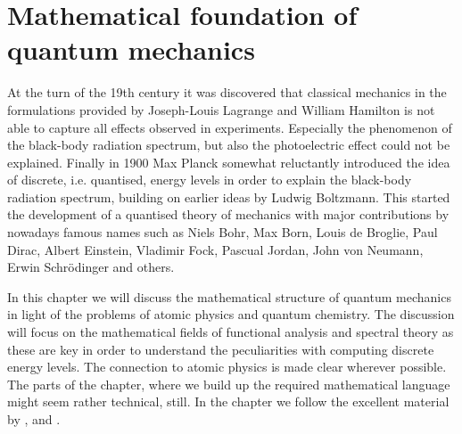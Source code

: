 \chapter{Mathematical foundation of quantum mechanics}
\label{ch:QM}


\noindent
At the turn of the 19th century it was discovered
that classical mechanics in the formulations provided
by Joseph-Louis Lagrange and William Hamilton
is not able to capture all effects observed in experiments.
Especially the phenomenon of the black-body radiation spectrum,
but also the photoelectric effect could not be explained.
Finally in 1900 Max Planck somewhat reluctantly introduced the idea of discrete,
i.e. quantised, energy levels
in order to explain the black-body radiation spectrum,
building on earlier ideas by Ludwig Boltzmann.
This started the development of a quantised theory of mechanics
with major contributions by nowadays famous names such as
Niels Bohr, Max Born, Louis de Broglie, Paul Dirac, Albert Einstein,
Vladimir Fock, Pascual Jordan, John von Neumann, Erwin Schrödinger
and others.

In this chapter we will discuss the mathematical structure
of quantum mechanics in light of the problems of atomic physics
and quantum chemistry.
The discussion will focus on the mathematical fields of functional
analysis and spectral theory as these are key in order
to understand the peculiarities with computing discrete energy levels.
The connection to atomic physics is made clear wherever possible.
The parts of the chapter, where we build up the required
mathematical language might seem rather technical, still.
In the chapter we follow the excellent material by \citet{Shankar1994},
\citet{Mueller2000} and \citet{Helffer2013}.





